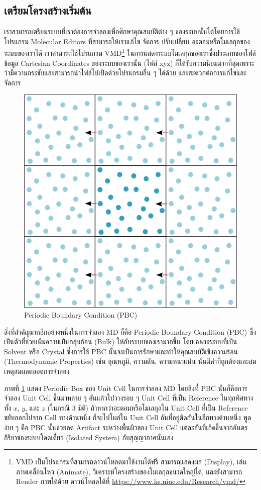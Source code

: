\subsection{เตรียมโครงสร้างเริ่มต้น}

เราสามารถเตรียมระบบที่เราต้องการจำลองเพื่อศึกษาคุณสมบัติต่าง ๆ ของระบบนั้นได้โดยการใช้โปรแกรม Molecular Editors ที่สามารถให้เราแก้ไข จัดการ ปรับเปลี่ยน อะตอมหรือโมเลกุลของระบบของเราได้ เราสามารถใช้โปรแกรม VMD\footnote{VMD เป็นโปรแกรมที่สามารถดาวน์โหลดมาใช้งานได้ฟรี สามารถแสดงผล (Display), เล่นภาพเคลื่อนไหว (Animate), วิเคราะห์โครงสร้างของโมเลกุลขนาดใหญ่ได้, และยังสามารถ Render ภาพได้ด้วย ดาวน์โหลดได้ที่ \url{https://www.ks.uiuc.edu/Research/vmd/}} ในการแสดงระบบโมเลกุลของเราซึ่งประเภทของไฟล์ข้อมูล Cartesian Coordinates ของระบบของเรานั้น (ไฟล์ xyz) ก็ได้รับความนิยมมากที่สุดเพราะว่ามีความกระชับและสามารถนำไฟล์ไปเปิดด้วยโปรแกรมอื่น ๆ ได้ด้วย และสะดวกต่อการแก้ไขและจัดการ

\begin{figure}[H]
  \centering
  \includegraphics[width=0.5\linewidth]{fig/pbc.png}
  \caption{Periodic Boundary Condition (PBC)}
  \label{fig:pbc}
\end{figure}

สิ่งที่สำคัญมากอีกอย่างหนึ่งในการจำลอง MD ก็คือ Periodic Boundary Condition (PBC) ซึ่งเป็นตัวที่ช่วยเพิ่มความเป็นกลุ่มก้อน (Bulk) ให้กับระบบของเรามากขึ้น โดยเฉพาะระบบที่เป็น Solvent หรือ Crystal ซึ่งการใช้ PBC นั้นจะเป็นการรักษาและทำให้คุณสมบัติเชิงความร้อน (Thermodynamic Properties) เช่น อุณหภูมิ, ความดัน, ความหนาแน่น นั้นมีค่าที่ถูกต้องและสมเหตุสมผลตลอดการจำลอง

ภาพที่ \ref{fig:pbc} แสดง Periodic Box ของ Unit Cell ในการจำลอง MD โดยสิ่งที่ PBC นั้นก็คือการจำลอง Unit Cell ขึ้นมาหลาย ๆ อันแล้วไปวางรอบ ๆ Unit Cell ที่เป็น Reference ในทุกทิศทางทั้ง $x$, $y$, และ $z$ (ในกรณี 3 มิติ) ถ้าหากว่าอะตอมหรือโมเลกุลใน Unit Cell ที่เป็น Reference ขยับออกไปจาก Cell ทางด้านหนึ่ง ก็จะไปโผล่ใน Unit Cell อันที่อยู่ติดกันในอีกทางด้านหนึ่ง พูดง่าย ๆ คือ PBC นั้นช่วยลด Artifact ระหว่างพื้นผิวของ Unit Cell แต่ละอันที่เกิดขึ้นจากอันตรกิริยาของระบบโดดเดี่ยว (Isolated System) กับสุญญากาศนั่นเอง

